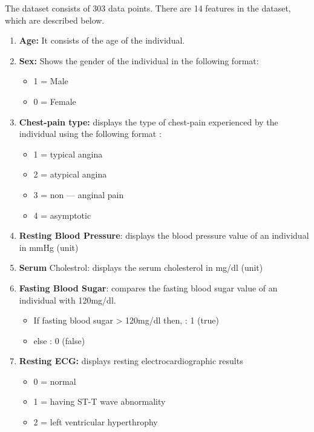 \documentclass[oneside,12pt]{Classes/VTU}
\begin{document}
  The dataset consists of 303 data points. There are 14 features in the dataset, which are described below.
  \begin{enumerate}
  	\item\textbf{Age:} It consists of the age of the individual.
  	
  	\item \textbf{Sex:} Shows the gender of the individual in the following format:
  		\begin{itemize}
  			\item 1 = Male
  			\item 0 = Female
  		\end{itemize}
  	
  	\item \textbf{Chest-pain type:} displays the type of chest-pain experienced by the individual using the following format :
  		\begin{itemize}
  			\item 1 = typical angina\tiny\textcolor{white}{s}\normalsize
  			\item 2 = atypical angina\tiny\textcolor{white}{s}\normalsize
  			\item 3 = non — anginal pain
  			\item 4 = asymptotic
  		\end{itemize}
  
  	\item \textbf{Resting Blood Pressure}: displays the blood pressure value of an individual in mmHg (unit)
  	
  	\item \textbf{Serum} Cholestrol: displays the serum cholesterol in mg/dl (unit)
  	
  	\item \textbf{Fasting Blood Sugar}: compares the fasting blood sugar value of an individual with 120mg/dl.
  		\begin{itemize}
  			\item If fasting blood sugar > 120mg/dl then, : 1 (true)
  			\item else                                    : 0 (false)
  		\end{itemize}
  	
  	\item \textbf{Resting ECG:} displays resting electrocardiographic results
  	\begin{itemize}
  		\item 0 = normal
  		\item 1 = having ST-T wave abnormality
  		\item 2 = left ventricular hyperthrophy
  	\end{itemize}
  	

\end{enumerate}
\end{document}
